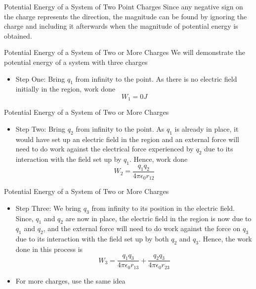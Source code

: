 \documentclass{beamer}
\begin{document}
\begin{frame}{Potential Energy of a System of Two Point Charges}{}
Since any negative sign on the charge represents the direction, the magnitude can be found by ignoring the charge and including it afterwards when the magnitude of potential energy is obtained.
\end{frame}

\begin{frame}{Potential Energy of a System of Two or More Charges}{}
We will demonstrate the potential energy of a system with three charges
  \begin{itemize}
  \item Step One: Bring \(q_1\) from infinity to the point.  As there is no electric field initially in the region, work done \[W_1=0J\]
  \end{itemize}
\end{frame}

\begin{frame}{Potential Energy of a System of Two or More Charges}{}
  \begin{itemize}
  \item Step Two: Bring \(q_2\) from infinity to the point.  As \(q_1\) is already in place, it would have set up an electric field in the region and an external force will need to do work against the electrical force experienced by \(q_2\) due to its interaction with the field set up by \(q_1\). Hence, work done
  \[W_2=\frac{q_1 q_2}{4\pi \epsilon_0 r_{12}}\]
  \end{itemize}
\end{frame}

\begin{frame}{Potential Energy of a System of Two or More Charges}{}
  \begin{itemize}
  \item Step Three: We bring \(q_3\) from infinity to its position in the electric field.  Since, \(q_1\) and \(q_2\) are now in place, the electric field in the region is now due to \(q_1\) and \(q_2\), and the external force will need to do work against the force on \(q_3\) due to its interaction with the field set up by both \(q_2\) and \(q_3\). Hence, the work done in this process is
  \[W_3=\frac{q_1 q_3}{4\pi \epsilon_0 r_{13}} + \frac{q_2 q_3}{4\pi \epsilon_0 r_{23}}\]
  \item For more charges, use the same idea
  \end{itemize}
\end{frame}
\end{document}
